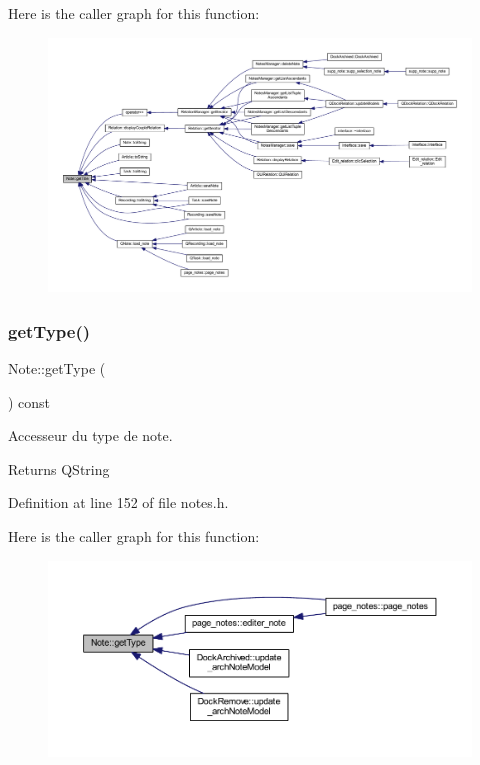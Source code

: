 Here is the caller graph for this function\+:\nopagebreak
\begin{figure}[H]
\begin{center}
\leavevmode
\includegraphics[width=350pt]{class_note_afd40e5372b7fd231bbd31038bf0bb4d9_icgraph}
\end{center}
\end{figure}
\mbox{\label{class_note_a342ef6ee08089d6b973e46c0bbfd8735}} 
\subsubsection{\texorpdfstring{get\+Type()}{getType()}}
{\footnotesize\ttfamily Note\+::get\+Type (\begin{DoxyParamCaption}{ }\end{DoxyParamCaption}) const\hspace{0.3cm}{\ttfamily [inline]}}



Accesseur du type de note. 

\begin{DoxyReturn}{Returns}
Q\+String 
\end{DoxyReturn}


Definition at line 152 of file notes.\+h.

Here is the caller graph for this function\+:\nopagebreak
\begin{figure}[H]
\begin{center}
\leavevmode
\includegraphics[width=350pt]{class_note_a342ef6ee08089d6b973e46c0bbfd8735_icgraph}
\end{center}
\end{figure}
\mbox{\label{class_note_a0c2cc72d7f3235c665a30ef915c5c58d}} 
